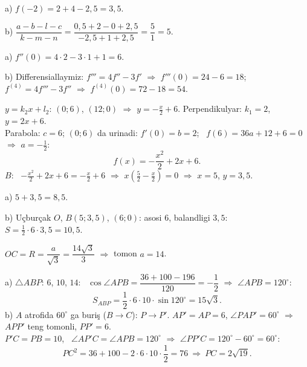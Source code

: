 a) $f(-2)=2+4-2{,}5=3{,}5$.

b) $\dfrac{a-b-l-c}{k-m-n}=\dfrac{0{,}5+2-0+2{,}5}{-2{,}5+1+2{,}5}=\dfrac51=5$.

\newpage
{}
a) $f''(0)=4\cdot2-3\cdot1+1=6$.

b) Differensiallaymiz: $f'''=4f''-3f'$ $\Rightarrow$ $f'''(0)=24-6=18$;\\
\phantom{b) }$f^{(4)}=4f'''-3f''$ $\Rightarrow$ $f^{(4)}(0)=72-18=54$.

\newpage
{}
$y=k_2x+l_2$: $(0;6)$, $(12;0)$ $\Rightarrow$ $y=-\frac x2+6$. Perpendikulyar: $k_1=2$, $y=2x+6$.\\
Parabola: $c=6$; $(0;6)$ da urinadi: $f'(0)=b=2$; \ $f(6)=36a+12+6=0$ $\Rightarrow$ $a=-\frac12$:
\[f(x)=-\frac{x^2}2+2x+6.\]
$B$: \ $-\frac{x^2}2+2x+6=-\frac x2+6$ $\Rightarrow$ $x\left(\frac52-\frac x2\right)=0$ $\Rightarrow$ $x=5$, $y=3{,}5$.

a) $5+3{,}5=8{,}5$.

b) Uçburçak $O$, $B(5;3{,}5)$, $(6;0)$: asosi $6$, balandligi $3{,}5$: \ $S=\frac12\cdot6\cdot3{,}5=10{,}5$.

\newpage
{}
$OC=R=\dfrac{a}{\sqrt3}=\dfrac{14\sqrt3}3$ $\Rightarrow$ tomon $a=14$.

a) $\triangle ABP$: $6$, $10$, $14$: \ $\cos\angle APB=\dfrac{36+100-196}{120}=-\dfrac12$ $\Rightarrow$ $\angle APB=120^\circ$:
\[S_{ABP}=\frac12\cdot6\cdot10\cdot\sin120^\circ=15\sqrt3.\]
b) $A$ atrofida $60^\circ$ ga buriş ($B\to C$): $P\to P'$. $AP'=AP=6$, $\angle PAP'=60^\circ$ $\Rightarrow$ $APP'$ teng tomonli, $PP'=6$.\\
$P'C=PB=10$, \ $\angle AP'C=\angle APB=120^\circ$ $\Rightarrow$ $\angle PP'C=120^\circ-60^\circ=60^\circ$:
\[PC^2=36+100-2\cdot6\cdot10\cdot\frac12=76\ \Rightarrow\ PC=2\sqrt{19}.\]

